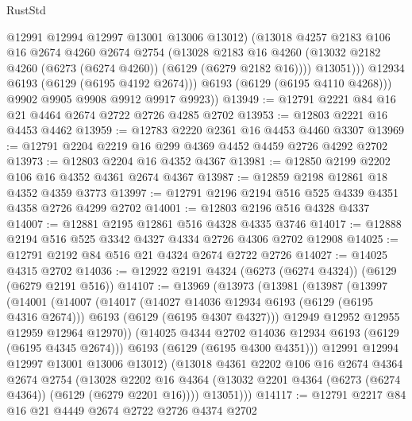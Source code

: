 \begin{lexlean}{RustStd}
\begin{coremodule}
                  @12991
                  @12994
                  @12997
                  @13001
                  @13006
                  @13012)
                (@13018
                  @4257
                  @2183
                  @106
                  @16
                  @2674
                  @4260
                  @2674
                  @2754
                  (@13028
                    @2183
                    @16
                    @4260
                    (@13032 @2182 @4260 (@6273 (@6274 @4260)) (@6129 (@6279 @2182 @16))))
                  @13051)))
            @12934
            @6193
            (@6129 (@6195 @4192 @2674)))
          @6193
          (@6129 (@6195 @4110 @4268)))
        @9902
        @9905
        @9908
        @9912
        @9917
        @9923))
@13949 := @12791 @2221 @84 @16 @21 @4464 @2674 @2722 @2726 @4285 @2702
@13953 := @12803 @2221 @16 @4453 @4462
@13959 := @12783 @2220 @2361 @16 @4453 @4460 @3307
@13969 := @12791 @2204 @2219 @16 @299 @4369 @4452 @4459 @2726 @4292 @2702
@13973 := @12803 @2204 @16 @4352 @4367
@13981 := @12850 @2199 @2202 @106 @16 @4352 @4361 @2674 @4367
@13987 := @12859 @2198 @12861 @18 @4352 @4359 @3773
@13997 := @12791 @2196 @2194 @516 @525 @4339 @4351 @4358 @2726 @4299 @2702
@14001 := @12803 @2196 @516 @4328 @4337
@14007 := @12881 @2195 @12861 @516 @4328 @4335 @3746
@14017 := @12888 @2194 @516 @525 @3342 @4327 @4334 @2726 @4306 @2702 @12908
@14025 := @12791 @2192 @84 @516 @21 @4324 @2674 @2722 @2726
@14027 := @14025 @4315 @2702
@14036 := @12922 @2191 @4324 (@6273 (@6274 @4324)) (@6129 (@6279 @2191 @516))
@14107 := @13969
    (@13973
      (@13981
        (@13987
          (@13997
            (@14001
              (@14007
                (@14017
                  (@14027 @14036 @12934 @6193 (@6129 (@6195 @4316 @2674)))
                  @6193
                  (@6129 (@6195 @4307 @4327)))
                @12949
                @12952
                @12955
                @12959
                @12964
                @12970))
            (@14025 @4344 @2702 @14036 @12934 @6193 (@6129 (@6195 @4345 @2674)))
            @6193
            (@6129 (@6195 @4300 @4351)))
          @12991
          @12994
          @12997
          @13001
          @13006
          @13012)
        (@13018
          @4361
          @2202
          @106
          @16
          @2674
          @4364
          @2674
          @2754
          (@13028
            @2202
            @16
            @4364
            (@13032 @2201 @4364 (@6273 (@6274 @4364)) (@6129 (@6279 @2201 @16))))
          @13051)))
@14117 := @12791 @2217 @84 @16 @21 @4449 @2674 @2722 @2726 @4374 @2702

\end{coremodule}
\end{lexlean}
